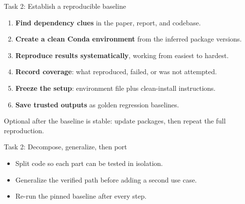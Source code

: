 \begin{frame}{Task 2: Establish a reproducible baseline}
  \vfill
  \vspace{-0.45cm}
  \begin{enumerate}\setlength\itemsep{0.45em}
    \item \textbf{Find dependency clues} in the paper, report, and codebase.
    \item \textbf{Create a clean Conda environment} from the inferred package versions.
    \item \textbf{Reproduce results systematically}, working from easiest to hardest.
    \item \textbf{Record coverage}: what reproduced, failed, or was not attempted.
    \item \textbf{Freeze the setup}: environment file plus clean-install instructions.
    \item \textbf{Save trusted outputs} as golden regression baselines.
  \end{enumerate}
  \vspace{0.55em}
  \begin{center}\small
    Optional after the baseline is stable: update packages, then repeat the full reproduction.
  \end{center}
  \vfill
\end{frame}

\begin{frame}[fragile]{Task 2: Decompose, generalize, then port}
  \vfill
  \begin{center}
  \end{center}
  \vspace{0.75em}
  \begin{itemize}\setlength\itemsep{0.55em}
    \item Split code so each part can be tested in isolation.
    \item Generalize the verified path before adding a second use case.
    \item Re-run the pinned baseline after every step.
  \end{itemize}
  \vfill
  \begin{center}
  \end{center}
  \vspace{1.1cm plus 1fill}
\end{frame}
